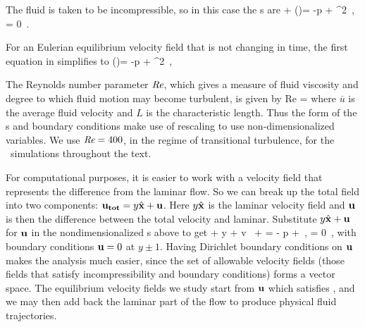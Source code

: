 \documentclass[lineno]{jfm}
\begin{document}
 The fluid is taken to be incompressible, so in this case the
 {\NSe}s are
 \beq
  + (\bu \cdot \nabla)\bu = -\nabla p +  \nabla^{2} \bu
    \,,\qquad
\nabla \cdot \bu  = 0 \,. \label{eqn:NavierStokes} \eeq 



For an Eulerian equilibrium velocity field that is not changing in time, 
the first equation in  simplifies to 
\beq
 (\bu \cdot \nabla)\bu = -\nabla p +  \nabla^{2} \bu
    \,, 
 
The Reynolds number parameter $\Reynolds$, which gives a measure of fluid 
viscosity and degree to which fluid motion may become turbulent, is given 
by 
\beq Re =  
\eeq 
where $\overline{u}$ is the average fluid velocity and $L$ is the 
characteristic length. Thus the form of the {\NSe}s and boundary 
conditions make use of rescaling to use non-dimensionalized variables. We 
use $\textit{Re} = 400$, in the regime of transitional turbulence, for the 
\pCf\ simulations throughout the text. 

For computational purposes, it is easier to work with a velocity field  that
represents the {difference} from the laminar flow. 
So we can break up the total field into two components: ${\bf u_{tot}} =
y \hat{\bf x} + {\bf u}$. Here $y \hat{\bf x}$ is the laminar velocity
field and ${\bf u}$ is then the difference between the total velocity and
laminar. Substitute $y \hat{\bf x} + {\bf u}$ for ${\bf u}$ in the
nondimensionalized {\NSe}s above to get
\beq
    + y  
    + v \, 
    + \bu \cdot \bnabla \bu
=
    - \bnabla p
    + 
        \lapl \bu  \,, \quad \nabla \cdot \bu = 0
\,,
with boundary conditions ${\bf u} = 0 $ at $y \pm 1$.  Having 
Dirichlet boundary conditions on ${\bf u}$ makes the analysis much easier, 
since the set of allowable velocity fields (those fields that satisfy 
incompressibility and boundary conditions) forms a vector space. The 
equilibrium velocity fields we study start from ${\bf u}$ which satisfies 
, and we may then add back the laminar part of the 
flow to produce physical fluid trajectories. 
\end{document}
